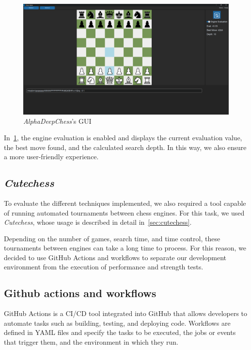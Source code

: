 \begin{figure}[H]
    \centering
    \includegraphics[width=1.0\textwidth]{Imagenes/gui.png}
    \caption{\textit{AlphaDeepChess}'s GUI}\label{fig:gui}
\end{figure}

\noindent In~\cref{fig:gui}, the engine evaluation is enabled and displays the current evaluation value, the best move found, and the calculated search depth. In this way, we also ensure a more user-friendly experience.


\subsection*{\textit{Cutechess}}

\noindent To evaluate the different techniques implemented, we also required a tool capable of running automated tournaments between chess engines. For this task, we used \textit{Cutechess}, whose usage is described in detail in~\cref{sec:cutechess}.

\vspace{1em}

\noindent Depending on the number of games, search time, and time control, these tournaments between engines can take a long time to process. For this reason, we decided to use GitHub Actions and workflows to separate our development environment from the execution of performance and strength tests.

\vspace{1em}

\subsection*{Github actions and workflows}

GitHub Actions is a CI/CD tool integrated into GitHub that allows developers to automate tasks such as building, testing, and deploying code. Workflows are defined in YAML files and specify the tasks to be executed, the jobs or events that trigger them, and the environment in which they run.

